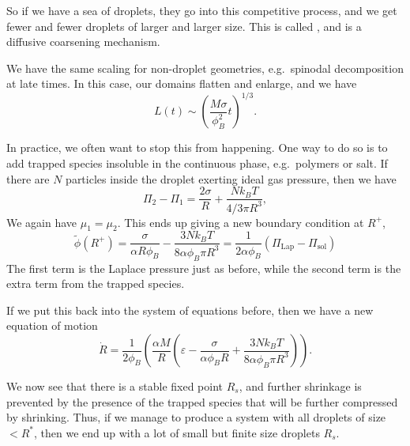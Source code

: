 \documentclass[a4paper]{article}
\begin{document}
So if we have a sea of droplets, they go into this competitive process, and we get fewer and fewer droplets of larger and larger size. This is called , and is a diffusive coarsening mechanism.

We have the same scaling for non-droplet geometries, e.g.\ spinodal decomposition at late times. In this case, our domains flatten and enlarge, and we have
\[
  L(t) \sim \left(\frac{M\sigma}{\phi_B^2} t\right)^{1/3}.
\]

In practice, we often want to stop this from happening. One way to do so is to add trapped species insoluble in the continuous phase, e.g.\ polymers or salt. If there are $N$ particles inside the droplet exerting ideal gas pressure, then we have
\[
  \Pi_2 - \Pi_1 = \frac{2\sigma}{R} + \frac{Nk_B T}{4/3 \pi R^3},
\]
We again have $\mu_1 = \mu_2$. This ends up giving a new boundary condition at $R^+$,
\[
  \tilde{\phi}(R^+) = \frac{\sigma}{\alpha R \phi_B} - \frac{3N k_B T}{8 \alpha \phi_B \pi R^3} = \frac{1}{2 \alpha \phi_B} (\Pi_{\mathrm{Lap}} - \Pi_{\mathrm{sol}})
\]
The first term is the Laplace pressure just as before, while the second term is the extra term from the trapped species.

If we put this back into the system of equations before, then we have a new equation of motion
\[
  \dot{R} = \frac{1}{2 \phi_B} \left( \frac{\alpha M}{R} \left(\varepsilon - \frac{\sigma}{\alpha \phi_B R} + \frac{3 N k_B T}{8 \alpha \phi_B \pi R^3}\right)\right).
\]
\begin{center}
\end{center}
We now see that there is a stable fixed point $R_s$, and further shrinkage is prevented by the presence of the trapped species that will be further compressed by shrinking. Thus, if we manage to produce a system with all droplets of size $< R^*$, then we end up with a lot of small but finite size droplets $R_s$.
\end{document}
